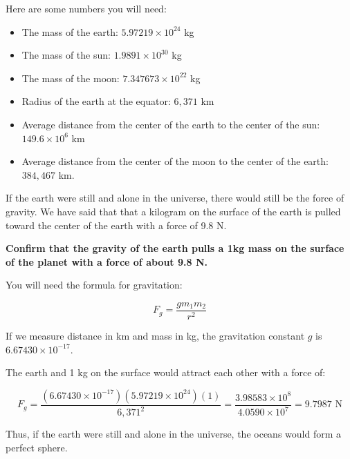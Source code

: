 Here are some numbers you will need:
\begin{itemize}
\item The mass of the earth: $5.97219 \times 10^{24}$ kg
\item The mass of the sun:  $1.9891 \times 10^{30}$ kg
\item The mass of the moon: $7.347673 \times 10^{22}$ kg
\item Radius of the earth at the equator: $6,371$ km
\item Average distance from the center of the earth to the center of the sun:  $149.6 \times 10^6$ km
\item Average distance from the center of the moon to the center of the earth: $384,467$ km.
\end{itemize}


\begin{Exercise}[title={Life Among the Orbits 1: Earth Gravity}, label=life-orbits1]


If the earth were still and alone in the universe,  there would still be the force of gravity.  We have said that that a kilogram on the surface of the earth is pulled toward the center of the earth with a force of 9.8 N.   

\textbf{Confirm that the gravity of the earth pulls a 1kg mass on the surface of the planet with a force of about 9.8 N.}

You will need the formula for gravitation: 

$$F_g = \frac{g m_1 m_2}{r^2}$$

If we measure distance in km and mass in kg,  the gravitation constant $g$ is $6.67430 \times 10^{-17}$.  

\end{Exercise}
\begin{Answer}[ref=life-orbits1]

The earth and 1 kg on the surface would attract each other with a force of:

$$F_g = \frac{\left( 6.67430 \times 10^{-17} \right) \left(5.97219 \times 10^{24}\right) \left(1\right)}{6,371^2} =  
\frac{3.98583 \times 10^{8}}{4.0590 \times 10^{7}}  = 9.7987 \text{ N}$$

Thus, if the earth were still and alone in the universe,  the oceans would form a perfect sphere.

\end{Answer}

